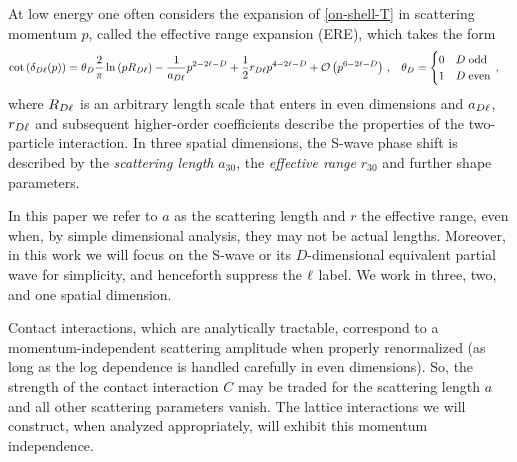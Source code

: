 At low energy one often considers the expansion of \eqref{on-shell-T} in scattering momentum $p$, called the effective range expansion (ERE), which takes the form \cite{Hammer:2010fw}
\begin{align}
    \label{eq:ere}
    \cot \left(\delta_{D\ell}(p)\right)
    &=
    \theta_D \frac{2}{\pi}  \ln \left(p R_{D\ell}\right)
    -
    \frac{1}{a_{D\ell}} p^{2 - 2 \ell - D} +\frac{1}{2} r_{D\ell} p^{4 - 2 \ell - D} + \mathcal{O}\left(p^{6 - 2 \ell - D}\right)
    \, , &
    \theta_D &= \begin{cases}
        0 & D \;\text{odd} \\ 1 & D \;\text{even}
    \end{cases}
    \, ,
\end{align}
where $R_{D \ell}$ is an arbitrary length scale that enters in even dimensions and $a_{D\ell}$, $r_{D\ell}$ and subsequent higher-order coefficients describe the properties of the two-particle interaction.
In three spatial dimensions, the S-wave phase shift is described by the \emph{scattering length} $a_{30}$, the \emph{effective range} $r_{30}$ and further shape parameters.

In this paper we refer to $a$ as the scattering length and $r$ the effective range, even when, by simple dimensional analysis, they may not be actual lengths.
Moreover, in this work we will focus on the S-wave or its $D$-dimensional equivalent partial wave for simplicity, and henceforth suppress the $\ell$ label.  We work in three, two, and one spatial dimension.

Contact interactions, which are analytically tractable, correspond to a momentum-independent scattering amplitude when properly renormalized (as long as the log dependence is handled carefully in even dimensions).
So, the strength of the contact interaction $C$ may be traded for the scattering length $a$ and all other scattering parameters vanish.
The lattice interactions we will construct, when analyzed appropriately, will exhibit this momentum independence.

